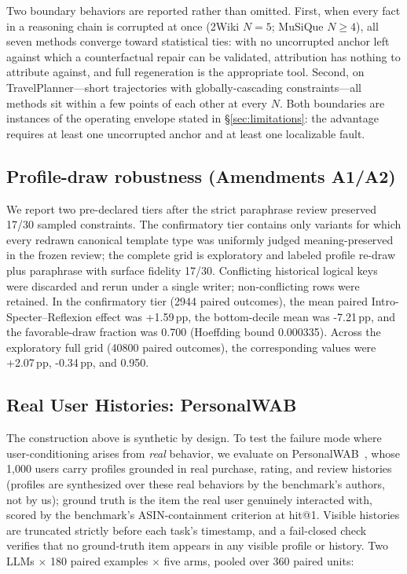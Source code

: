 \documentclass{article}
\begin{document}
Two boundary behaviors are reported rather than omitted. First, when every fact in a reasoning chain is corrupted at once (2Wiki $N{=}5$; MuSiQue $N{\ge}4$), all seven methods converge toward statistical ties: with no uncorrupted anchor left against which a counterfactual repair can be validated, attribution has nothing to attribute against, and full regeneration is the appropriate tool. Second, on TravelPlanner---short trajectories with globally-cascading constraints---all methods sit within a few points of each other at every $N$. Both boundaries are instances of the operating envelope stated in \S\ref{sec:limitations}: the advantage requires at least one uncorrupted anchor and at least one localizable fault.

\subsection{Profile-draw robustness (Amendments A1/A2)}
We report two pre-declared tiers after the strict paraphrase review preserved 17/30 sampled constraints. The confirmatory tier contains only variants for which every redrawn canonical template type was uniformly judged meaning-preserved in the frozen review; the complete grid is exploratory and labeled profile re-draw plus paraphrase with surface fidelity 17/30. Conflicting historical logical keys were discarded and rerun under a single writer; non-conflicting rows were retained. In the confirmatory tier (2944 paired outcomes), the mean paired Intro-Specter--Reflexion effect was +1.59\,pp, the bottom-decile mean was -7.21\,pp, and the favorable-draw fraction was 0.700 (Hoeffding bound 0.000335). Across the exploratory full grid (40800 paired outcomes), the corresponding values were +2.07\,pp, -0.34\,pp, and 0.950.

\subsection{Real User Histories: PersonalWAB}\label{sec:personalwab}

The construction above is synthetic by design. To test the failure mode where user-conditioning arises from \emph{real} behavior, we evaluate on PersonalWAB~\citep{cai2025personalwab}, whose 1{,}000 users carry profiles grounded in real purchase, rating, and review histories (profiles are synthesized over these real behaviors by the benchmark's authors, not by us); ground truth is the item the real user genuinely interacted with, scored by the benchmark's ASIN-containment criterion at hit@1. Visible histories are truncated strictly before each task's timestamp, and a fail-closed check verifies that no ground-truth item appears in any visible profile or history. Two LLMs $\times$ 180 paired examples $\times$ five arms, pooled over 360 paired units:
\end{document}
